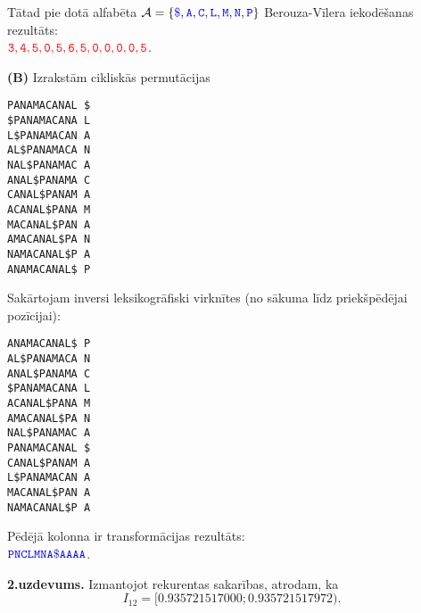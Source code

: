 \documentclass[a4paper]{article}
\begin{document}

Tātad pie dotā alfabēta 
$=\{\textcolor{blue}{\mathtt{\$}},\textcolor{blue}{},\textcolor{blue}{},
\textcolor{blue}{},\textcolor{blue}{},\textcolor{blue}{},\textcolor{blue}{} \}$
Berouza-Vīlera iekodēšanas rezultāts:\\
$\textcolor{red}{}$.


\newpage
{\bf (B)} Izrakstām cikliskās permutācijas
\begin{verbatim}
PANAMACANAL $
$PANAMACANA L
L$PANAMACAN A
AL$PANAMACA N
NAL$PANAMAC A
ANAL$PANAMA C
CANAL$PANAM A
ACANAL$PANA M
MACANAL$PAN A
AMACANAL$PA N
NAMACANAL$P A
ANAMACANAL$ P
\end{verbatim}

Sakārtojam inversi leksikogrāfiski virknītes (no sākuma līdz priekšpēdējai pozīcijai):

\begin{verbatim}
ANAMACANAL$ P
AL$PANAMACA N
ANAL$PANAMA C
$PANAMACANA L
ACANAL$PANA M
AMACANAL$PA N
NAL$PANAMAC A
PANAMACANAL $
CANAL$PANAM A
L$PANAMACAN A
MACANAL$PAN A
NAMACANAL$P A
\end{verbatim}

Pēdējā kolonna ir transformācijas rezultāts:\\ 
$\textcolor{blue}{}$.


\vspace{20pt}
{\bf 2.uzdevums.} 
Izmantojot rekurentas sakarības, atrodam, ka 
$$I_{12} = [0.935721517000; 0.935721517972).$$
\end{document}
